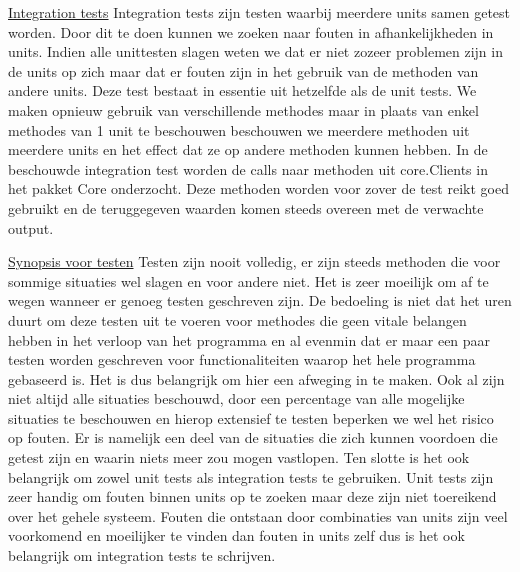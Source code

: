 \documentclass{article}
\begin{document}
\newpage
\maketitle
\noindent
\underline{Integration tests}\newline
\newline
Integration tests zijn testen waarbij meerdere units samen getest worden. Door dit te doen kunnen we zoeken naar fouten in afhankelijkheden in units. Indien alle unittesten slagen weten we dat er niet zozeer problemen zijn in de units op zich maar dat er fouten zijn in het gebruik van de methoden van andere units.\newline
\newline
Deze test bestaat in essentie uit hetzelfde als de unit tests. We maken opnieuw gebruik van verschillende methodes maar in plaats van enkel methodes van 1 unit te beschouwen beschouwen we meerdere methoden uit meerdere units en het effect dat ze op andere methoden kunnen hebben. \newline
\newline
In de beschouwde integration test worden de calls naar methoden uit core.Clients in het pakket Core onderzocht. Deze methoden worden voor zover de test reikt goed gebruikt en de teruggegeven waarden komen steeds overeen met de verwachte output.\newline
\newline
\maketitle
\noindent
\underline{Synopsis voor testen}\newline
\newline
Testen zijn nooit volledig, er zijn steeds methoden die voor sommige situaties wel slagen en voor andere niet. Het is zeer moeilijk om af te wegen wanneer er genoeg testen geschreven zijn. De bedoeling is niet dat het uren duurt om deze testen uit te voeren voor methodes die geen vitale belangen hebben in het verloop van het programma en al evenmin dat er maar een paar testen worden geschreven voor functionaliteiten waarop het hele programma gebaseerd is. Het is dus belangrijk om hier een afweging in te maken.\newline
\newline
Ook al zijn niet altijd alle situaties beschouwd, door een percentage van alle mogelijke situaties te beschouwen en hierop extensief te testen beperken we wel het risico op fouten. Er is namelijk een deel van de situaties die zich kunnen voordoen die getest zijn en waarin niets meer zou mogen vastlopen. \newline
\newline
Ten slotte is het ook belangrijk om zowel unit tests als integration tests te gebruiken. Unit tests zijn zeer handig om fouten binnen units op te zoeken maar deze zijn niet toereikend over het gehele systeem. Fouten die ontstaan door combinaties van units zijn veel voorkomend en moeilijker te vinden dan fouten in units zelf dus is het ook belangrijk om integration tests te schrijven.
\end{document}
